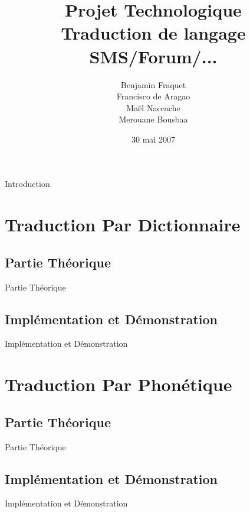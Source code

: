 \documentclass{beamer}
\title{Projet Technologique\\
		Traduction de langage SMS/Forum/...}
\author{Benjamin Fraquet\\
		Francisco de Aragao\\
		Maël Naccache\\
		Merouane Bousbaa}
\institute{Université de Nantes}
\date{30 mai 2007}
\begin{document}
\begin{frame}
\titlepage
\end{frame}

\begin{frame}
\tableofcontents
\end{frame}

\begin{frame}{Introduction}

\end{frame}

\section{Traduction Par Dictionnaire}

\subsection{Partie Théorique}
\begin{frame}{Partie Théorique}

\end{frame}

\subsection{Implémentation et Démonstration}
\begin{frame}{Implémentation et Démonstration}

\end{frame}


\section{Traduction Par Phonétique}

\subsection{Partie Théorique}
\begin{frame}{Partie Théorique}

\end{frame}

\subsection{Implémentation et Démonstration}
\begin{frame}{Implémentation et Démonstration}

\end{frame}
\end{document}
